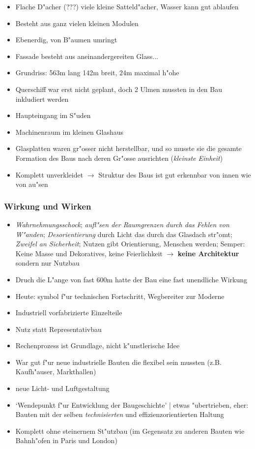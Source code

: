 \documentclass[emulatestandardclasses]{scrartcl}
\begin{document}
\begin{itemize}
  \item Flache D"acher (???) viele kleine Satteld"acher, Wasser kann gut ablaufen
  \item Besteht aus ganz vielen kleinen Modulen
  \item Ebenerdig, von B"aumen umringt
  \item Fassade besteht aus aneinandergereiten Glass...
  \item Grundriss: 563m lang 142m breit, 24m maximal h"ohe
  \item Querschiff war erst nicht geplant, doch 2 Ulmen mussten in den Bau inkludiert werden
  \item Haupteingang im S"uden
  \item Machinenraum im kleinen Glashaus
  \item Glasplatten waren gr"osser nicht herstellbar, und so musste sie die gesamte Formation des Baus nach deren Gr"osse ausrichten (\emph{kleinste Einheit})
  \item Komplett unverkleidet $\rightarrow$ Struktur des Baus ist gut erkennbar von innen wie von au"sen
\end{itemize}

\subsubsection{Wirkung und Wirken}
\begin{itemize}
  \item \emph{Wahrnehmungsschock}; \emph{aufl"sen der Raumgrenzen durch das Fehlen von W"anden}; \emph{Desorientierung} durch Licht das durch das Glasdach str"omt; \emph{Zweifel an Sicherheit}; Nutzen gibt Orientierung, Menschen werden; Semper: Keine Masse und Dekoratives, keine Feierlichkeit $\rightarrow$ \textbf{keine Architektur} sondern nur Nutzbau
  \item Druch die L"ange von fast 600m hatte der Bau eine fast unendliche Wirkung 
  \item Heute: symbol f"ur technischen Fortschritt, Wegbereiter zur Moderne
  \item Industriell vorfabrizierte Einzelteile
  \item Nutz statt Representativbau
  \item Rechenprozess ist Grundlage, nicht k"unstlerische Idee
  \item War gut f"ur neue industrielle Bauten die flexibel sein mussten (z.B. Kaufh"auser, Markthallen)
  \item neue Licht- und Luftgestaltung
  \item `Wendepunkt f"ur Entwicklung der Baugeschichte' | etwas "ubertrieben, eher: Bauten mit der selben \emph{technisierten} und effizienzorientierten Haltung
  \item Komplett ohne steinernem St"utzbau (im Gegensatz zu anderen Bauten wie Bahnh"ofen in Paris und London)
\end{itemize}
\end{document}
